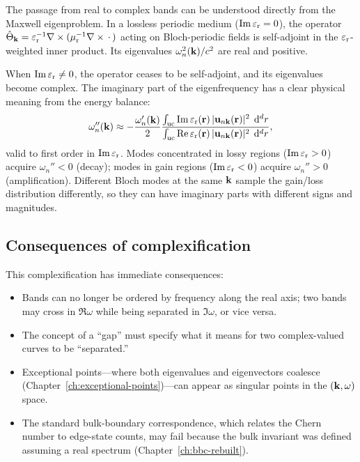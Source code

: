 The passage from real to complex bands can be understood directly from
the Maxwell eigenproblem. In a lossless periodic medium
($\operatorname{Im}\varepsilon_{\mathrm{r}} = 0$), the operator
$\hat{\Theta}_{\mathbf{k}} = \varepsilon_{\mathrm{r}}^{-1}\nabla\times(\mu_{\mathrm{r}}^{-1}\nabla\times\,\cdot\,)$ acting on
Bloch-periodic fields is self-adjoint in the $\varepsilon_{\mathrm{r}}$-weighted inner
product. Its eigenvalues $\omega_n^2(\mathbf{k})/c^2$ are real and positive.

When $\operatorname{Im}\varepsilon_{\mathrm{r}} \neq 0$, the operator ceases to be self-adjoint, and its
eigenvalues become complex. The imaginary part of the eigenfrequency
has a clear physical meaning from the energy balance:
\begin{equation}
 \omega_n''(\mathbf{k}) \approx -\frac{\omega_n'(\mathbf{k})}{2}
 \frac{\int_{\mathrm{uc}} \operatorname{Im}\varepsilon_{\mathrm{r}}(\mathbf{r})\,|\mathbf{u}_{n\mathbf{k}}(\mathbf{r})|^2\;\mathop{}\!\mathrm{d}^d r}
 {\int_{\mathrm{uc}} \operatorname{Re}\varepsilon_{\mathrm{r}}(\mathbf{r})\,|\mathbf{u}_{n\mathbf{k}}(\mathbf{r})|^2\;\mathop{}\!\mathrm{d}^d r},
 \label{eq:omega-imag-perturbation}
\end{equation}
valid to first order in $\operatorname{Im}\varepsilon_{\mathrm{r}}$. Modes concentrated in lossy regions
($\operatorname{Im}\varepsilon_{\mathrm{r}} > 0$) acquire $\omega_n'' < 0$ (decay); modes in gain
regions ($\operatorname{Im}\varepsilon_{\mathrm{r}} < 0$) acquire $\omega_n'' > 0$ (amplification).
Different Bloch modes at the same $\mathbf{k}$ sample the gain/loss distribution
differently, so they can have imaginary parts with different signs and
magnitudes.

\subsection{Consequences of complexification}
\label{ssec:complex-consequences}

This complexification has immediate consequences:
\begin{itemize}
 \item Bands can no longer be ordered by frequency along the real axis;
 two bands may cross in $\Re\omega$ while being separated in
 $\Im\omega$, or vice versa.
 \item The concept of a ``gap'' must specify what it means for two
 complex-valued curves to be ``separated.''
 \item Exceptional points---where both eigenvalues and eigenvectors
 coalesce (Chapter~\ref{ch:exceptional-points})---can appear as
 singular points in the $(\mathbf{k}, \omega)$ space.
 \item The standard bulk-boundary correspondence, which relates the
 Chern number to edge-state counts, may fail because the bulk
 invariant was defined assuming a real spectrum
 (Chapter~\ref{ch:bbc-rebuilt}).
\end{itemize}

